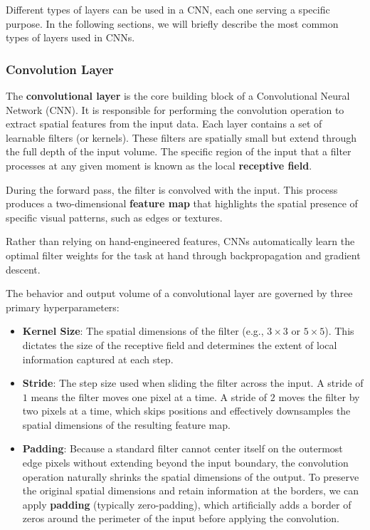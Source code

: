 Different types of layers can be used in a CNN, each one serving a specific purpose. In the following sections, we will briefly describe the most common types of layers used in CNNs.

\subsubsection{Convolution Layer}
The \textbf{convolutional layer} is the core building block of a Convolutional Neural Network (CNN). 
It is responsible for performing the convolution operation to extract spatial features from the input data. 
Each layer contains a set of learnable filters (or kernels). These filters are spatially small but extend through the full depth of the input volume. 
The specific region of the input that a filter processes at any given moment is known as the local \textbf{receptive field}.

During the forward pass, the filter is convolved with the input. This process produces a two-dimensional \textbf{feature map} 
that highlights the spatial presence of specific visual patterns, such as edges or textures.

Rather than relying on hand-engineered features, CNNs automatically learn the optimal filter weights for the task at hand through backpropagation and gradient descent.

The behavior and output volume of a convolutional layer are governed by three primary hyperparameters:
\begin{itemize}
    \item \textbf{Kernel Size}: The spatial dimensions of the filter (e.g., $3 \times 3$ or $5 \times 5$). This dictates the size of the receptive field and determines the extent of local information captured at each step.
    \item \textbf{Stride}: The step size used when sliding the filter across the input. A stride of $1$ means the filter moves one pixel at a time. A stride of $2$ moves the filter by two pixels at a time, which skips positions and effectively downsamples the spatial dimensions of the resulting feature map.
    \item \textbf{Padding}: Because a standard filter cannot center itself on the outermost edge pixels without extending beyond the input boundary, the convolution operation naturally shrinks the spatial dimensions of the output. To preserve the original spatial dimensions and retain information at the borders, we can apply \textbf{padding} (typically zero-padding), which artificially adds a border of zeros around the perimeter of the input before applying the convolution.
\end{itemize}

